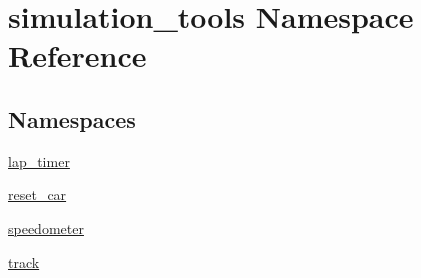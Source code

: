 \hypertarget{namespacesimulation__tools}{}\section{simulation\+\_\+tools Namespace Reference}
\label{namespacesimulation__tools}
\subsection*{Namespaces}
\begin{DoxyCompactItemize}
\item 
 \hyperlink{namespacesimulation__tools_1_1lap__timer}{lap\+\_\+timer}
\item 
 \hyperlink{namespacesimulation__tools_1_1reset__car}{reset\+\_\+car}
\item 
 \hyperlink{namespacesimulation__tools_1_1speedometer}{speedometer}
\item 
 \hyperlink{namespacesimulation__tools_1_1track}{track}
\end{DoxyCompactItemize}
